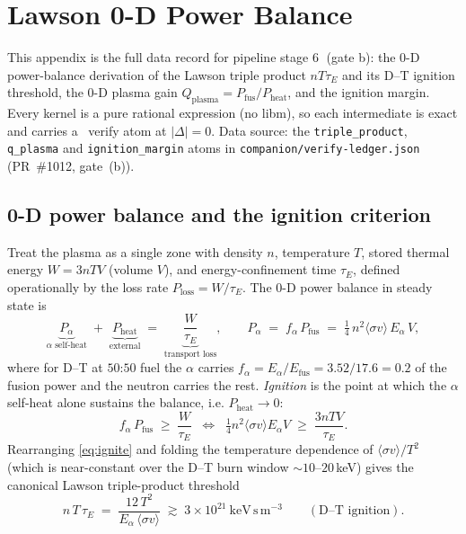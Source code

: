 \section{Lawson 0-D Power Balance}
\label{app:lawson}

This appendix is the full data record for pipeline stage
\textcircled{\scriptsize 6} (gate b): the 0-D power-balance derivation of
the Lawson triple product $nT\tau_{\!E}$ and its D--T ignition threshold,
the 0-D plasma gain $Q_{\text{plasma}}=P_{\text{fus}}/P_{\text{heat}}$, and
the ignition margin. Every kernel is a pure rational expression (no libm),
so each intermediate is exact and carries a \tierGreen\ verify atom at
$|\Delta|=0$. Data source: the \verb|triple_product|, \verb|q_plasma| and
\verb|ignition_margin| atoms in \texttt{companion/verify-ledger.json}
(PR~\#1012, gate~(b)).

\subsection{0-D power balance and the ignition criterion}
\label{app:lawson-balance}

Treat the plasma as a single zone with density $n$, temperature $T$, stored
thermal energy $W=3nT V$ (volume $V$), and energy-confinement time
$\tau_{\!E}$, defined operationally by the loss rate $P_{\text{loss}}=W/\tau_{\!E}$.
The 0-D power balance in steady state is
\begin{equation}
\underbrace{P_\alpha}_{\text{$\alpha$ self-heat}}
  \;+\;
\underbrace{P_{\text{heat}}}_{\text{external}}
  \;=\;
\underbrace{\frac{W}{\tau_{\!E}}}_{\text{transport loss}},
\qquad
P_\alpha \;=\; f_\alpha\,P_{\text{fus}}
  \;=\;
  \tfrac14\,n^2\langle\sigma v\rangle\,E_\alpha\,V,
\label{eq:balance}
\end{equation}
where for D--T at $50$:$50$ fuel the $\alpha$ carries $f_\alpha=E_\alpha/
E_{\text{fus}}=3.52/17.6=0.2$ of the fusion power and the neutron carries the
rest. \emph{Ignition} is the point at which the $\alpha$ self-heat alone
sustains the balance, i.e. $P_{\text{heat}}\to 0$:
\begin{equation}
f_\alpha\,P_{\text{fus}} \;\ge\; \frac{W}{\tau_{\!E}}
\;\;\Longleftrightarrow\;\;
\tfrac14 n^2\langle\sigma v\rangle E_\alpha V \;\ge\; \frac{3nTV}{\tau_{\!E}}.
\label{eq:ignite}
\end{equation}
Rearranging \eqref{eq:ignite} and folding the temperature dependence of
$\langle\sigma v\rangle/T^2$ (which is near-constant over the D--T burn
window $\sim\!10$--$20$\,keV) gives the canonical Lawson triple-product
threshold
\begin{equation}
n\,T\,\tau_{\!E}
  \;=\;
  \frac{12\,T^2}{E_\alpha\,\langle\sigma v\rangle}
  \;\gtrsim\;
  3\times10^{21}\ \text{keV}\,\text{s}\,\text{m}^{-3}
  \qquad(\text{D--T ignition}).
\label{eq:triple}
\end{equation}

